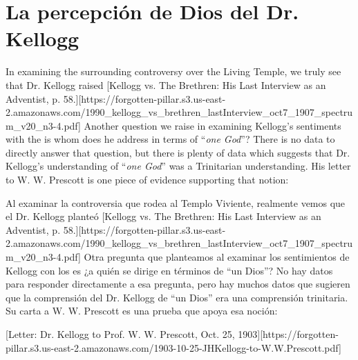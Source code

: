\section*{La percepción de Dios del Dr. Kellogg}


In examining the surrounding controversy over the Living Temple, we truly see that Dr. Kellogg raised [Kellogg vs. The Brethren: His Last Interview as an Adventist, p. 58.][https://forgotten-pillar.s3.us-east-2.amazonaws.com/1990\_kellogg\_vs\_brethren\_lastInterview\_oct7\_1907\_spectrum\_v20\_n3-4.pdf] Another question we raise in examining Kellogg's sentiments with the  is whom does he address in terms of “\textit{one God}”? There is no data to directly answer that question, but there is plenty of data which suggests that Dr. Kellogg's understanding of “\textit{one God}” was a Trinitarian understanding. His letter to W. W. Prescott is one piece of evidence supporting that notion:


Al examinar la controversia que rodea al Templo Viviente, realmente vemos que el Dr. Kellogg planteó [Kellogg vs. The Brethren: His Last Interview as an Adventist, p. 58.][https://forgotten-pillar.s3.us-east-2.amazonaws.com/1990\_kellogg\_vs\_brethren\_lastInterview\_oct7\_1907\_spectrum\_v20\_n3-4.pdf] Otra pregunta que planteamos al examinar los sentimientos de Kellogg con los  es ¿a quién se dirige en términos de “un Dios”? No hay datos para responder directamente a esa pregunta, pero hay muchos datos que sugieren que la comprensión del Dr. Kellogg de “un Dios” era una comprensión trinitaria. Su carta a W. W. Prescott es una prueba que apoya esa noción:


[Letter: Dr. Kellogg to Prof. W. W. Prescott, Oct. 25, 1903][https://forgotten-pillar.s3.us-east-2.amazonaws.com/1903-10-25-JHKellogg-to-W.W.Prescott.pdf]


